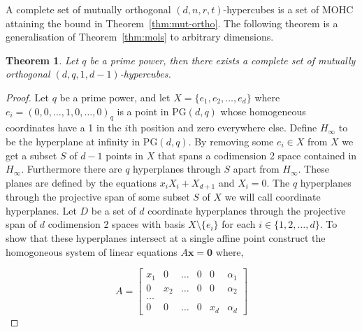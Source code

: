\documentclass{article}
\newtheorem{theorem}{Theorem}
\newcommand{\PG}{\mathrm{PG}}
\begin{document}
A complete set of mutually orthogonal \((d,n,r,t)\)-hypercubes is a set of MOHC attaining the bound in Theorem~\ref{thm:mut-ortho}. The following theorem is a generalisation of Theorem~\ref{thm:mols} to arbitrary dimensions.

\begin{theorem}\label{thm:general-ortho-proof}
  Let \(q\) be a prime power, then there exists a complete set of mutually orthogonal \((d, q, 1, d - 1)\)-hypercubes.
\end{theorem}

\begin{proof}
  Let \(q\) be a prime power, and let \(X = \{e_{1}, e_{2}, \ldots, e_{d}\}\) where \(e_{i} = (0, 0, \ldots, 1, 0, \ldots, 0)_{q}\) is a point in \(\PG(d, q)\) whose homogeneous coordinates have a 1 in the \(i\)th position and zero everywhere else. Define \(H_{\infty}\) to be the hyperplane at infinity in \(\PG(d, q)\).
  By removing some \(e_i \in X\) from \(X\) we get a subset \(S\) of \(d - 1\) points in \(X\) that spans a codimension 2 space contained in \(H_{\infty}\). Furthermore there are \(q\) hyperplanes through \(S\) apart from \(H_{\infty}\). These planes are defined by the equations \(x_i X_i + X_{d + 1}\) and \(X_{i} = 0\).
  The \(q\) hyperplanes through the projective span of some subset \(S\) of \(X\) we will call coordinate hyperplanes. Let \(D\) be a set of \(d\) coordinate hyperplanes through the projective span of \(d\) codimension 2 spaces with basis \(X \setminus \{e_{i}\}\) for each \(i \in \{1, 2, \ldots, d\}\). To show that these hyperplanes intersect at a single affine point construct the homogoneous system of linear equations \(A \mathbf{x} = \mathbf{0}\) where,

  \begin{equation*}
    A = \begin{bmatrix}
      x_1 & 0 & \ldots & 0 & 0 & \alpha_1 \\
      0 & x_2 & \ldots & 0 & 0 & \alpha_2 \\
      \ldots \\
      0 & 0 & \ldots & 0 & x_d & \alpha_d
    \end{bmatrix}
  \end{equation*}


\end{proof}
\end{document}
